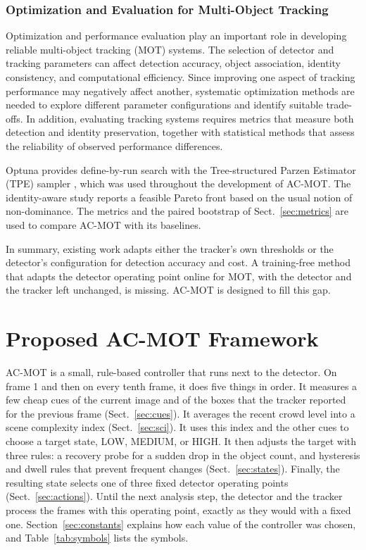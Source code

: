 \documentclass[pdflatex,sn-mathphys-num,iicol]{sn-jnl}
\begin{document}
\subsubsection{Optimization and Evaluation for Multi-Object Tracking}
Optimization and performance evaluation play an important role in developing reliable multi-object tracking (MOT) systems. The selection of detector and tracking parameters can affect detection accuracy, object association, identity consistency, and computational efficiency. Since improving one aspect of tracking performance may negatively affect another, systematic optimization methods are needed to explore different parameter configurations and identify suitable trade-offs. In addition, evaluating tracking systems requires metrics that measure both detection and identity preservation, together with statistical methods that assess the reliability of observed performance differences.

Optuna provides define-by-run search with the Tree-structured Parzen Estimator
(TPE) sampler \cite{akiba2019optuna}, which was used throughout the
development of AC-MOT. The identity-aware study reports a feasible Pareto
front based on the usual notion of non-dominance. The metrics and the paired
bootstrap of Sect.~\ref{sec:metrics} are used to compare AC-MOT with its
baselines.

In summary, existing work adapts either the tracker's own thresholds or the
detector's configuration for detection accuracy and cost. A training-free
method that adapts the detector operating point online for MOT, with the
detector and the tracker left unchanged, is missing. AC-MOT is designed to
fill this gap.
\section{Proposed AC-MOT Framework}\label{sec:method}
AC-MOT is a small, rule-based controller that runs next to the detector. On
frame 1 and then on every tenth frame, it does five things in order. It
measures a few cheap cues of the current image and of the boxes that the
tracker reported for the previous frame (Sect.~\ref{sec:cues}). It averages
the recent crowd level into a scene complexity index (Sect.~\ref{sec:sci}). It
uses this index and the other cues to choose a target state, LOW, MEDIUM, or
HIGH. It then adjusts the target with three rules: a recovery probe for a
sudden drop in the object count, and hysteresis and dwell rules that prevent
frequent changes (Sect.~\ref{sec:states}). Finally, the resulting state
selects one of three fixed detector operating points
(Sect.~\ref{sec:actions}). Until the next analysis step, the detector and the
tracker process the frames with this operating point, exactly as they would
with a fixed one.
Section~\ref{sec:constants} explains how each value of the controller was
chosen, and Table~\ref{tab:symbols} lists the symbols.
\end{document}
